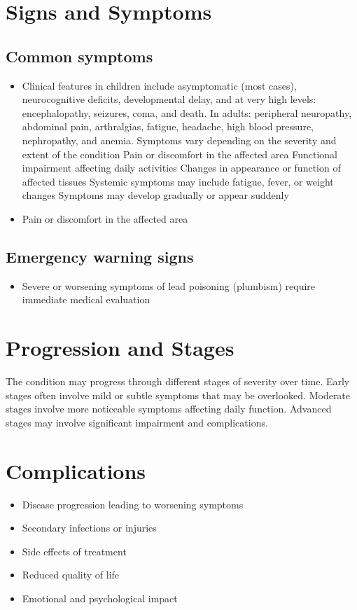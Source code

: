 \section{Signs and Symptoms}

\subsection{Common symptoms}
\begin{itemize}[noitemsep]
  \item Clinical features in children include asymptomatic (most cases), neurocognitive deficits, developmental delay, and at very high levels: encephalopathy, seizures, coma, and death. In adults: peripheral neuropathy, abdominal pain, arthralgias, fatigue, headache, high blood pressure, nephropathy, and anemia. Symptoms vary depending on the severity and extent of the condition Pain or discomfort in the affected area Functional impairment affecting daily activities Changes in appearance or function of affected tissues Systemic symptoms may include fatigue, fever, or weight changes Symptoms may develop gradually or appear suddenly
  \item Pain or discomfort in the affected area
  \end{itemize}

\subsection{Emergency warning signs}
\begin{itemize}[noitemsep]
  \item Severe or worsening symptoms of lead poisoning (plumbism) require immediate medical evaluation
\end{itemize}
\section{Progression and Stages}
The condition may progress through different stages of severity over time. Early stages often involve mild or subtle symptoms that may be overlooked. Moderate stages involve more noticeable symptoms affecting daily function. Advanced stages may involve significant impairment and complications.
\section{Complications}
\begin{itemize}[noitemsep]
  \item Disease progression leading to worsening symptoms
  \item Secondary infections or injuries
  \item Side effects of treatment
  \item Reduced quality of life
  \item Emotional and psychological impact
\end{itemize}
